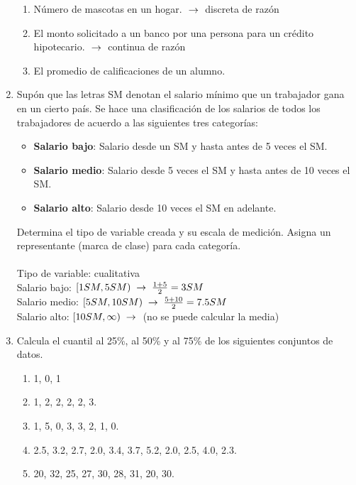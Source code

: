 \documentclass[11pt,a4paper]{report}
\begin{document}
\begin{enumerate}
\begin{enumerate}
    \item Número de mascotas en un hogar. $\hspace{0.1cm} \rightarrow \hspace{0.1cm} $ discreta de razón
    \item El monto solicitado a un banco por una persona para un crédito hipotecario. $\hspace{0.1cm} \rightarrow \hspace{0.1cm} $ continua de razón
    \item El promedio de calificaciones de un alumno. 
\end{enumerate}

\item Supón que las letras SM denotan el salario mínimo que un trabajador gana en un cierto país. Se hace una clasificación de los salarios de todos los trabajadores de acuerdo a las siguientes tres categorías:
    
    \begin{itemize}
        \item \textbf{Salario bajo}: Salario desde un SM y hasta antes de 5 veces el SM.
        \item \textbf{Salario medio}: Salario desde 5 veces el SM y hasta antes de 10 veces el SM.
        \item \textbf{Salario alto}: Salario desde 10 veces el SM en adelante.
    \end{itemize}

    Determina el tipo de variable creada y su escala de medición. Asigna un representante (marca de clase) para cada categoría. \\ \\
    Tipo de variable: cualitativa \\
    Salario bajo: $[1 SM, 5 SM) \hspace{0.1cm} \rightarrow \hspace{0.1cm} \frac{1+5}{2}=3 SM$ \\
    Salario medio: $[5 SM, 10 SM) \hspace{0.1cm} \rightarrow \hspace{0.1cm} \frac{5+10}{2}=7.5 SM$   \\
    Salario alto: $[10 SM, \infty) \hspace{0.1cm} \rightarrow \hspace{0.1cm}$ (no se puede calcular la media)


\item Calcula el cuantil al 25\%, al 50\% y al 75\% de los siguientes conjuntos de
datos.
\begin{enumerate}
    \item 1, 0, 1
    \item  1, 2, 2, 2, 2, 3.
    \item 1, 5, 0, 3, 3, 2, 1, 0.
    \item 2.5, 3.2, 2.7, 2.0, 3.4, 3.7, 5.2, 2.0, 2.5, 4.0, 2.3.
    \item 20, 32, 25, 27, 30, 28, 31, 20, 30.
\end{enumerate}


\end{enumerate}
\end{document}
